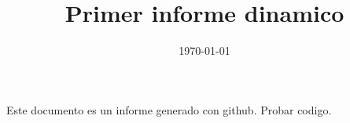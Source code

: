 \documentclass[12pt,a4paper]{book}
\title{Primer informe dinamico}
\author{}
\date{\today}
\begin{document}
\maketitle

Este documento es un informe generado con github.
Probar codigo.
\end{document}
